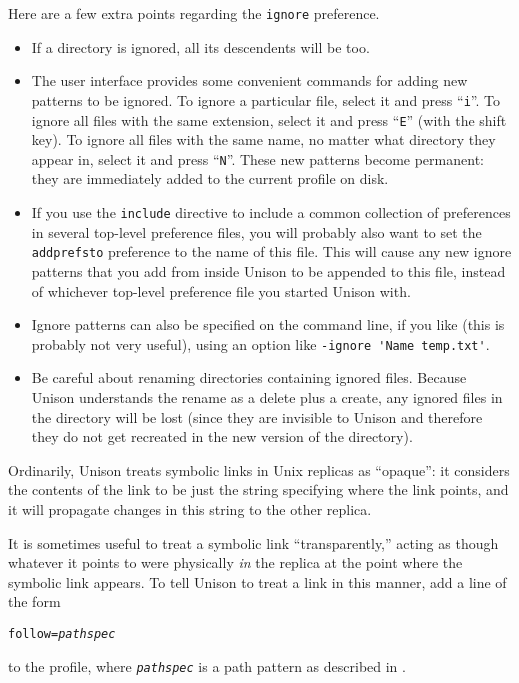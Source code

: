\documentclass{article}
\newcommand{\ARG}[1]{\texttt{\textit{#1}}}
\begin{document}
Here are a few extra points regarding the \texttt{ignore} preference.
\begin{itemize}
\item If a directory is ignored, all its descendents will be too.
  
\item The user interface provides some convenient commands for adding
  new patterns to be ignored.  To ignore a particular file, select it
  and press ``{\tt i}''.  To ignore all files with the same extension,
  select it and press ``{\tt E}'' (with the shift key).  To ignore all
  files with the same name, no matter what directory they appear in,
  select it and press ``{\tt N}''.
%
These new patterns become permanent: they
are immediately added to the current profile on disk.

\item If you use the \verb|include| directive to include a common
collection of preferences in several top-level preference files, you will
probably also want to set the \verb|addprefsto| preference to the name of
this file.  This will cause any new ignore patterns that you add from
inside Unison to be appended to this file, instead of whichever top-level
preference file you started Unison with.  

\item Ignore patterns can also be specified on the command line, if
you like (this is probably not very useful), using an option like
\verb|-ignore 'Name temp.txt'|.

\item Be careful about renaming directories containing ignored files.
Because Unison understands the rename as a delete plus a create, any ignored
files in the directory will be lost (since they are invisible to Unison and
therefore they do not get recreated in the new version of the directory).
\end{itemize} 


Ordinarily, Unison treats symbolic links in Unix replicas as
``opaque'': it considers the contents of the link to be just the
string specifying where the link points, and it will propagate changes in
this string to the other replica.

It is sometimes useful to treat a symbolic link ``transparently,''
acting as though whatever it points to were physically {\em in} the
replica at the point where the symbolic link appears.  To tell Unison
to treat a link in this manner, add a line of the form
\begin{alltt}
             follow = \ARG{pathspec}
\end{alltt}
to the profile, where \ARG{pathspec} is a path pattern as described in
.
\end{document}
